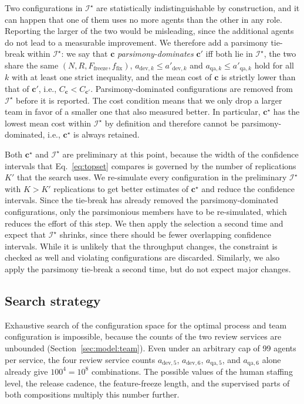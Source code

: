 \documentclass[smallextended]{svjour3}       %
\begin{document}
Two configurations in $\mathcal{I}^\star$ are statistically indistinguishable by construction, and it can happen that one of them uses no more agents than the other in any role. Reporting the larger of the two would be misleading, since the additional agents do not lead to a measurable improvement. We therefore add a parsimony tie-break within $\mathcal{I}^\star$: we say that $\mathbf{c}$ \emph{parsimony-dominates} $\mathbf{c}'$ iff both lie in $\mathcal{I}^\star$, the two share the same $(N, R, F_\mathrm{freeze}, f_\mathrm{fix})$, $a_{\mathrm{dev},k} \leq a'_{\mathrm{dev},k}$ and $a_{\mathrm{qa},k} \leq a'_{\mathrm{qa},k}$ hold for all $k$ with at least one strict inequality, and the mean cost of $\mathbf{c}$ is strictly lower than that of $\mathbf{c}'$, i.e., $C_\mathbf{c} < C_{\mathbf{c}'}$. Parsimony-dominated configurations are removed from $\mathcal{I}^\star$ before it is reported. The cost condition means that we only drop a larger team in favor of a smaller one that also measured better. In particular, $\mathbf{c}^\star$ has the lowest mean cost within $\mathcal{I}^\star$ by definition and therefore cannot be parsimony-dominated, i.e., $\mathbf{c}^\star$ is always retained.

Both $\mathbf{c}^\star$ and $\mathcal{I}^\star$ are preliminary at this point, because the width of the confidence intervals that Eq.~\eqref{eq:topset} compares is governed by the number of replications $K'$ that the search uses. We re-simulate every configuration in the preliminary $\mathcal{I}^\star$ with $K > K'$ replications to get better estimates of $\mathbf{c}^\star$ and reduce the confidence intervals. Since the tie-break has already removed the parsimony-dominated configurations, only the parsimonious members have to be re-simulated, which reduces the effort of this step. We then apply the selection a second time and expect that $\mathcal{I}^\star$ shrinks, since there should be fewer overlapping confidence intervals. While it is unlikely that the throughput changes, the constraint is checked as well and violating configurations are discarded. Similarly, we also apply the parsimony tie-break a second time, but do not expect major changes.




\subsection{Search strategy}
\label{sec:model:search}

Exhaustive search of the configuration space for the optimal process and team configuration is impossible, because the counts of the two review services are unbounded (Section~\ref{sec:model:team}). Even under an arbitrary cap of 99 agents per service, the four review service counts $a_{\mathrm{dev},5}$, $a_{\mathrm{dev},6}$, $a_{\mathrm{qa},5}$, and $a_{\mathrm{qa},6}$ alone already give $100^4 = 10^8$ combinations. The possible values of the human staffing level, the release cadence, the feature-freeze length, and the supervised parts of both compositions multiply this number further.
\end{document}
